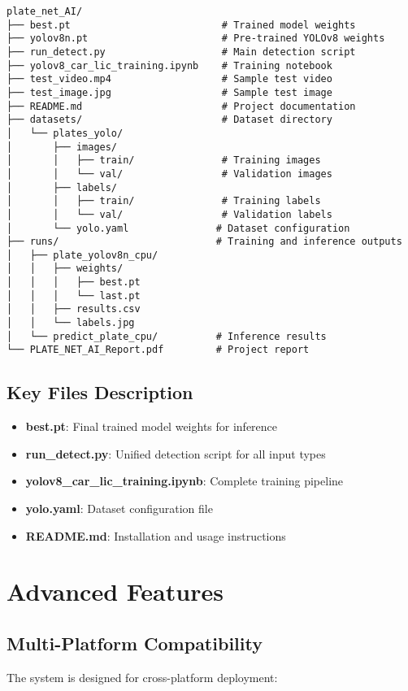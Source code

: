 \documentclass[12pt,a4paper]{article}
\begin{document}
\begin{lstlisting}[caption=Complete Project Structure]
plate_net_AI/
├── best.pt                          # Trained model weights
├── yolov8n.pt                       # Pre-trained YOLOv8 weights
├── run_detect.py                    # Main detection script
├── yolov8_car_lic_training.ipynb    # Training notebook
├── test_video.mp4                   # Sample test video
├── test_image.jpg                   # Sample test image
├── README.md                        # Project documentation
├── datasets/                        # Dataset directory
│   └── plates_yolo/
│       ├── images/
│       │   ├── train/               # Training images
│       │   └── val/                 # Validation images
│       ├── labels/
│       │   ├── train/               # Training labels
│       │   └── val/                 # Validation labels
│       └── yolo.yaml               # Dataset configuration
├── runs/                           # Training and inference outputs
│   ├── plate_yolov8n_cpu/
│   │   ├── weights/
│   │   │   ├── best.pt
│   │   │   └── last.pt
│   │   ├── results.csv
│   │   └── labels.jpg
│   └── predict_plate_cpu/          # Inference results
└── PLATE_NET_AI_Report.pdf         # Project report
\end{lstlisting}

\subsection{Key Files Description}
\begin{itemize}
    \item \textbf{best.pt}: Final trained model weights for inference
    \item \textbf{run\_detect.py}: Unified detection script for all input types
    \item \textbf{yolov8\_car\_lic\_training.ipynb}: Complete training pipeline
    \item \textbf{yolo.yaml}: Dataset configuration file
    \item \textbf{README.md}: Installation and usage instructions
\end{itemize}

\section{Advanced Features}

\subsection{Multi-Platform Compatibility}
The system is designed for cross-platform deployment:
\end{document}
